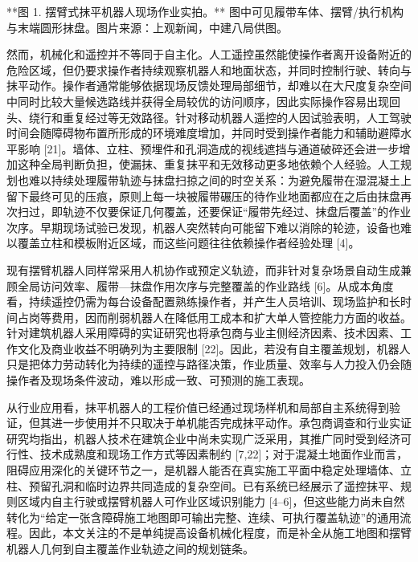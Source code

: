 **图 1. 摆臂式抹平机器人现场作业实拍。** 图中可见履带车体、摆臂/执行机构与末端圆形抹盘。图片来源：上观新闻，中建八局供图。

  

然而，机械化和遥控并不等同于自主化。人工遥控虽然能使操作者离开设备附近的危险区域，但仍要求操作者持续观察机器人和地面状态，并同时控制行驶、转向与抹平动作。操作者通常能够依据现场反馈处理局部细节，却难以在大尺度复杂空间中同时比较大量候选路线并获得全局较优的访问顺序，因此实际操作容易出现回头、绕行和重复经过等无效路径。针对移动机器人遥控的人因试验表明，人工驾驶时间会随障碍物布置所形成的环境难度增加，并同时受到操作者能力和辅助避障水平影响 [21]。墙体、立柱、预埋件和孔洞造成的视线遮挡与通道破碎还会进一步增加这种全局判断负担，使漏抹、重复抹平和无效移动更多地依赖个人经验。人工规划也难以持续处理履带轨迹与抹盘扫掠之间的时空关系：为避免履带在湿混凝土上留下最终可见的压痕，原则上每一块被履带碾压的待作业地面都应在之后由抹盘再次扫过，即轨迹不仅要保证几何覆盖，还要保证“履带先经过、抹盘后覆盖”的作业次序。早期现场试验已发现，机器人突然转向可能留下难以消除的轮迹，设备也难以覆盖立柱和模板附近区域，而这些问题往往依赖操作者经验处理 [4]。



现有摆臂机器人同样常采用人机协作或预定义轨迹，而非针对复杂场景自动生成兼顾全局访问效率、履带—抹盘作用次序与完整覆盖的作业路线 [6]。从成本角度看，持续遥控仍需为每台设备配置熟练操作者，并产生人员培训、现场监护和长时间占岗等费用，因而削弱机器人在降低用工成本和扩大单人管控能力方面的收益。针对建筑机器人采用障碍的实证研究也将承包商与业主侧经济因素、技术因素、工作文化及商业收益不明确列为主要限制 [22]。因此，若没有自主覆盖规划，机器人只是把体力劳动转化为持续的遥控与路径决策，作业质量、效率与人力投入仍会随操作者及现场条件波动，难以形成一致、可预测的施工表现。

  

从行业应用看，抹平机器人的工程价值已经通过现场样机和局部自主系统得到验证，但其进一步使用并不只取决于单机能否完成抹平动作。承包商调查和行业实证研究均指出，机器人技术在建筑企业中尚未实现广泛采用，其推广同时受到经济可行性、技术成熟度和现场工作方式等因素制约 [7,22]；对于混凝土地面作业而言，阻碍应用深化的关键环节之一，是机器人能否在真实施工平面中稳定处理墙体、立柱、预留孔洞和临时边界共同造成的复杂空间。已有系统已经展示了遥控抹平、规则区域内自主行驶或摆臂机器人可作业区域识别能力 [4–6]，但这些能力尚未自然转化为“给定一张含障碍施工地图即可输出完整、连续、可执行覆盖轨迹”的通用流程。因此，本文关注的不是单纯提高设备机械化程度，而是补全从施工地图和摆臂机器人几何到自主覆盖作业轨迹之间的规划链条。

  

